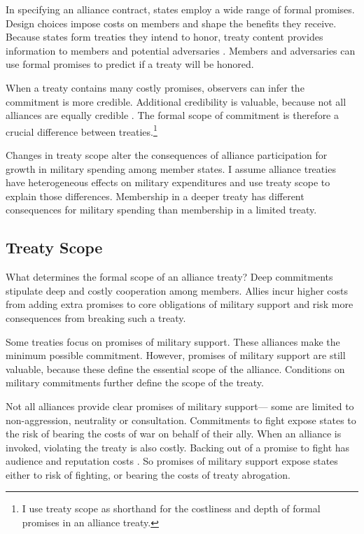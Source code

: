 \documentclass[12pt]{article}
\begin{document}
In specifying an alliance contract, states employ a wide range of formal promises. 
Design choices impose costs on members and shape the benefits they receive.
Because states form treaties they intend to honor, treaty content provides information to members and potential adversaries \citep{Leeds2003}. 
Members and adversaries can use formal promises to predict if a treaty will be honored.


When a treaty contains many costly promises, observers can infer the commitment is more credible. 
Additional credibility is valuable, because not all alliances are equally credible \citep{Benson2012}. 
The formal scope of commitment is therefore a crucial difference between treaties.\footnote{I use treaty scope as shorthand for the costliness and depth of formal promises in an alliance treaty.} 


Changes in treaty scope alter the consequences of alliance participation for growth in military spending among member states. 
I assume alliance treaties have heterogeneous effects on military expenditures and use treaty scope to explain those differences. 
Membership in a deeper treaty has different consequences for military spending than membership in a limited treaty. 


\subsection{Treaty Scope}


What determines the formal scope of an alliance treaty? 
Deep commitments stipulate deep and costly cooperation among members.
Allies incur higher costs from adding extra promises to core obligations of military support and risk more consequences from breaking such a treaty. 


Some treaties focus on promises of military support. 
These alliances make the minimum possible commitment. 
However, promises of military support are still valuable, because these define the essential scope of the alliance.  
Conditions on military commitments further define the scope of the treaty. 


Not all alliances provide clear promises of military support--- some are limited to non-aggression, neutrality or consultation. 
Commitments to fight expose states to the risk of bearing the costs of war on behalf of their ally. 
When an alliance is invoked, violating the treaty is also costly. 
Backing out of a promise to fight has audience \citep{Levyetal2015} and reputation costs \citep{Gibler2008, Crescenzietal2012, Mattes2012}. 
So promises of military support expose states either to risk of fighting, or bearing the costs of treaty abrogation. 
\end{document}
